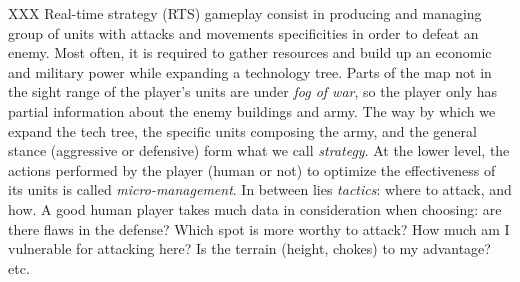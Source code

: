 XXX Real-time strategy (RTS) gameplay consist in producing and managing group of units with attacks and movements specificities in order to defeat an enemy. Most often, it is required to gather resources and build up an economic and military power while expanding a technology tree. Parts of the map not in the sight range of the player's units are under \textit{fog of war}, so the player only has partial information about the enemy buildings and army. The way by which we expand the tech tree, the specific units composing the army, and the general stance (aggressive or defensive) form what we call \textit{strategy}. At the lower level, the actions performed by the player (human or not) to optimize the effectiveness of its units is called \textit{micro-management}. In between lies \textit{tactics}: where to attack, and how. A good human player takes much data in consideration when choosing: are there flaws in the defense? Which spot is more worthy to attack? How much am I vulnerable for attacking here? Is the terrain (height, chokes) to my advantage? etc.

